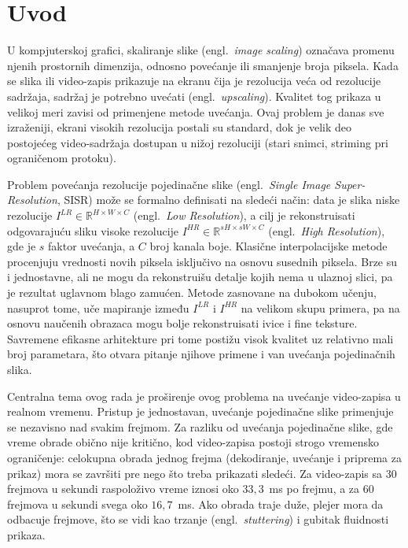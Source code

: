 \documentclass[12pt,a4paper]{article}
\begin{document}
\section{Uvod}
\label{sec:uvod}

U kompjuterskoj grafici, skaliranje slike (engl.\ \textit{image scaling}) označava promenu njenih prostornih dimenzija, odnosno povećanje ili smanjenje broja piksela. Kada se slika ili video-zapis prikazuje na ekranu čija je rezolucija veća od rezolucije sadržaja, sadržaj je potrebno uvećati (engl.\ \textit{upscaling}). Kvalitet tog prikaza u velikoj meri zavisi od primenjene metode uvećanja. Ovaj problem je danas sve izraženiji, ekrani visokih rezolucija postali su standard, dok je velik deo postojećeg video-sadržaja dostupan u nižoj rezoluciji (stari snimci, striming pri ograničenom protoku).

Problem povećanja rezolucije pojedinačne slike (engl.\ \textit{Single Image Super-Resolution}, SISR) može se formalno definisati na sledeći način: data je slika niske rezolucije $I^{LR} \in \mathbb{R}^{H \times W \times C}$ (engl.\ \textit{Low Resolution}), a cilj je rekonstruisati odgovarajuću sliku visoke rezolucije $I^{HR} \in \mathbb{R}^{sH \times sW \times C}$ (engl.\ \textit{High Resolution}), gde je $s$ faktor uvećanja, a $C$ broj kanala boje. Klasične interpolacijske metode procenjuju vrednosti novih piksela isključivo na osnovu susednih piksela. Brze su i jednostavne, ali ne mogu da rekonstruišu detalje kojih nema u ulaznoj slici, pa je rezultat uglavnom blago zamućen. Metode zasnovane na dubokom učenju, nasuprot tome, uče mapiranje između $I^{LR}$ i $I^{HR}$ na velikom skupu primera, pa na osnovu naučenih obrazaca mogu bolje rekonstruisati ivice i fine teksture. Savremene efikasne arhitekture pri tome postižu visok kvalitet uz relativno mali broj parametara, što otvara pitanje njihove primene i van uvećanja pojedinačnih slika.

Centralna tema ovog rada je proširenje ovog problema na uvećanje video-zapisa u realnom vremenu. Pristup je jednostavan, uvećanje pojedinačne slike primenjuje se nezavisno nad svakim frejmom. Za razliku od uvećanja pojedinačne slike, gde vreme obrade obično nije kritično, kod video-zapisa postoji strogo vremensko ograničenje: celokupna obrada jednog frejma (dekodiranje, uvećanje i priprema za prikaz) mora se završiti pre nego što treba prikazati sledeći. Za video-zapis sa $30$ frejmova u sekundi raspoloživo vreme iznosi oko $33{,}3$~ms po frejmu, a za $60$ frejmova u sekundi svega oko $16{,}7$~ms. Ako obrada traje duže, plejer mora da odbacuje frejmove, što se vidi kao trzanje (engl.\ \textit{stuttering}) i gubitak fluidnosti prikaza.
\end{document}

